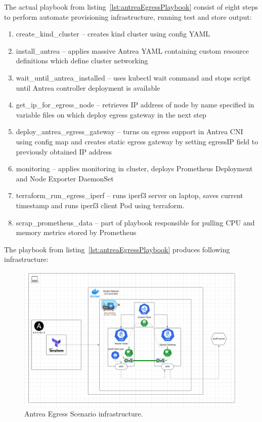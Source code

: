 The actual playbook from listing~\ref{lst:antreaEgressPlaybook} consist of eight steps to perform automate provisioning infrastructure, running test and store output:
\begin{enumerate}
  \item create\_kind\_cluster -- creates kind cluster using config YAML
  \item install\_antrea -- applies massive Antrea YAML containing custom resource definitions which define cluster networking 
  \item wait\_until\_antrea\_installed -- uses kubectl wait command and stops script until Antrea controller deployment is available
  \item get\_ip\_for\_egress\_node -- retrieves IP address of node by name specified in variable files on which deploy egress gateway in the next step 
  \item deploy\_antrea\_egress\_gateway -- turns on egress support in Antrea CNI using config map and creates static egress gateway by setting egressIP field to previously obtained IP address 
  \item monitoring -- applies monitoring in cluster, deploys Prometheus Deployment and Node Exporter DaemonSet
  \item terraform\_run\_egress\_iperf -- runs iperf3 server on laptop, saves current timestamp and runs iperf3 client Pod using terraform.
  \item scrap\_prometheus\_data -- part of playbook responsible for pulling CPU and memory metrics stored by Prometheus
\end{enumerate}

The playbook from listing~\ref{lst:antreaEgressPlaybook} produces following infrastructure:

\begin{figure}[tbh]
  \centering
  \includegraphics[width=1\columnwidth]{images/antrea_egress_gatateway_cluster.png}
  \caption{Antrea Egress Scenario infrastructure.}
  \label{fig:antreaEgressScenarioArch}
\end{figure}

